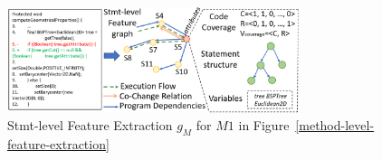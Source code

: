 
\begin{figure}[t]
	\centering
	\includegraphics[width=3.35in]{graphs/step-1-statement-2.png}
        \vspace{-15pt}
	\caption{Stmt-level Feature Extraction $g_M$ for $M1$ in Figure~\ref{method-level-feature-extraction}}
        \vspace{-5pt}
	\label{statement-level-feature-extraction}
\end{figure}


